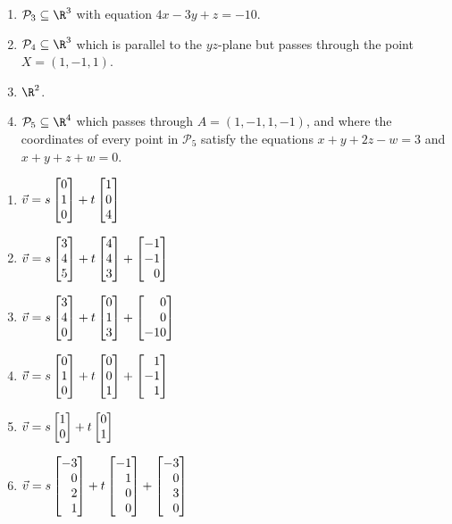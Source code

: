 \begin{exercises}
\begin{problist}
\begin{enumerate}
			\item   $\mathcal P_3\subseteq\R^3$ with equation $4x-3y+z=-10$.
			\item   $\mathcal P_4\subseteq\R^3$ which is parallel to the $yz$-plane but passes through the point $X=(1,-1,1)$.
			\item   $\R^2$.
			\item   $\mathcal P_5\subseteq\R^4$ which passes through $A=(1,-1,1,-1)$,
				and where the coordinates of every point in $\mathcal P_5$ satisfy the equations $x+y+2z-w=3$
				and $x+y+z+w=0$.
		\end{enumerate}
		\begin{solution}
    		\begin{enumerate}
    		    \item $\vec v = s\mat{0\\1\\0} + t\mat{1\\0\\4}$
    		    \item $\vec v = s\mat{3\\4\\5} + t\mat{4\\4\\3} + \mat{-1\\-1\\0}$
    		    \item $\vec v = s\mat{3\\4\\0} + t\mat{0\\1\\3} + \mat{0\\0\\-10}$
    		    \item $\vec v = s\mat{0\\1\\0} + t\mat{0\\0\\1} + \mat{1\\-1\\1}$
    		    \item $\vec v = s\mat{1\\0} + t\mat{0\\1}$
    		    \item $\vec v = s\mat{-3\\0\\2\\1} + t\mat{-1\\1\\0\\0} + \mat{-3\\0\\3\\0}$

\end{enumerate}
\end{solution}
\end{problist}
\end{exercises}
